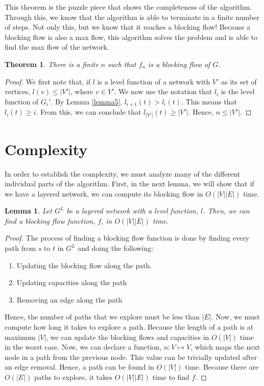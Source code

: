 \documentclass{report}
\newtheorem{lemma}{Lemma}[section]
\newtheorem{theorem}{Theorem}[section]
\begin{document}
This theorem is the puzzle piece that shows the completeness of the algorithm. Through this, we know that the algorithm is able to terminate in a finite number of steps. Not only this, but we know that it reaches a blocking flow! Because a blocking flow is also a max flow, this algorithm solves the  problem and is able to find the max flow of the network.
\begin{theorem}
    There is a finite $n$ such that $f_n$ is a blocking flow of $G$.
\end{theorem}
\begin{proof}
    We first note that, if $l$ is a level function of a network with $V'$ as its set of vertices, $l(v) \le |V'|$, where $v \in V'$. We now use the notation that $l_i$ is the level function of $G_i'$. By Lemma \ref{lemma5}, $l_{i+1}(t) > l_i(t)$. This means that $l_i(t) \ge i$. From this, we can conclude that $l_{|V'|}(t) \ge |V'|$. Hence, $n \le |V'|$.
\end{proof}

\section{Complexity}
In order to establish the complexity, we must analyze many of the different individual parts of the algorithm. First, in the next lemma, we will show that if we have a layered network, we can compute its blocking flow in $O(|V||E|)$ time.
\begin{lemma}
    Let $G^L$ be a layered network with a level function, $l$. Then, we can find a blocking flow function, $f$, in $O(|V||E|)$ time.
\end{lemma}
\begin{proof}
    The process of finding a blocking flow function is done by finding every path from $s$ to $t$ in $G^L$ and doing the following:
    \begin{enumerate}
        \item Updating the blocking flow along the path.
        \item Updating capacities along the path
        \item Removing an edge along the path
    \end{enumerate}
    Hence, the number of paths that we explore must be less than $|E|$. Now, we must compute how long it takes to explore a path. Because the length of a path is at maximum $|V|$, we can update the blocking flows and capacities in $O(|V|)$ time in the worst case. Now, we can declare a function, $n : V \mapsto V$, which maps the next node in a path from the previous node. This value can be trivially updated after an edge removal. Hence, a path can be found in $O(|V|)$ time. Because there are $O(|E|)$ paths to explore, it takes $O(|V||E|)$ time to find $f$.
\end{proof}
\end{document}

